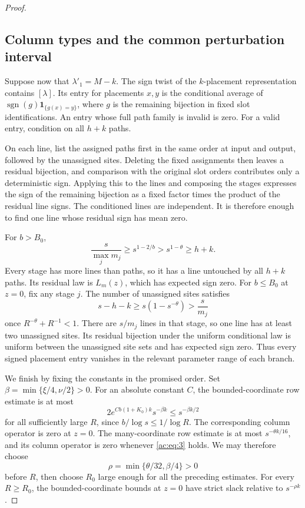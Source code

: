 \begin{proof}
\subsection{Column types and the common perturbation interval}

Suppose now that \(\lambda'_1=M-k\). The sign twist of the \(k\)-placement
representation contains \([\lambda]\). Its entry for placements \(x,y\) is
the conditional average of
\(\operatorname{sgn}(g)\mathbf1_{\{g(x)=y\}}\), where \(g\) is the remaining
bijection in fixed slot identifications. An entry whose full path family is
invalid is zero. For a valid entry, condition on all \(h+k\) paths.

On each line, list the assigned paths first in the same order at input and
output, followed by the unassigned sites. Deleting the fixed assignments
then leaves a residual bijection, and comparison with the original slot
orders contributes only a deterministic sign. Applying this to the lines and
composing the stages expresses the sign of the remaining bijection as a fixed
factor times the product of the residual line signs. The conditioned lines
are independent. It is therefore enough to find one line whose residual sign
has mean zero.

For \(b>B_0\),
\[
 \frac{s}{\max_jm_j}\ge s^{1-2/b}>s^{1-\theta}\ge h+k.
\]
Every stage has more lines than paths, so it has a line untouched by all
\(h+k\) paths. Its residual law is \(L_m(z)\), which has expected sign zero.
For \(b\le B_0\) at \(z=0\), fix any stage \(j\). The number of unassigned
sites satisfies
\[
 s-h-k\ge s(1-s^{-\theta})>\frac{s}{m_j}
\]
once \(R^{-\theta}+R^{-1}<1\). There are \(s/m_j\) lines in that stage, so one
line has at least two unassigned sites. Its residual bijection under the
uniform conditional law is uniform between the unassigned site sets and has expected sign
zero. Thus every signed placement entry vanishes in the relevant parameter
range of each branch.

We finish by fixing the constants in the promised order. Set
\(\beta=\min\{\xi/4,\nu/2\}>0\). For an absolute constant \(C\), the
bounded-coordinate row estimate is at most
\[
 2e^{Cb(1+K_0)k}s^{-\beta k}\le s^{-\beta k/2}
\]
for all sufficiently large \(R\), since \(b/\log s\le1/\log R\).
The corresponding
column operator is zero at \(z=0\). The many-coordinate row estimate is
at most \(s^{-\theta k/16}\), and its column operator is zero whenever
\eqref{ac:eq:3} holds. We may therefore choose
\[
 \rho=\min\{\theta/32,\beta/4\}>0
\]
before \(R\), then choose \(R_0\) large enough for all the preceding estimates.
For every \(R\ge R_0\), the bounded-coordinate bounds at \(z=0\) have strict
slack relative to \(s^{-\rho k}\).


\end{proof}
